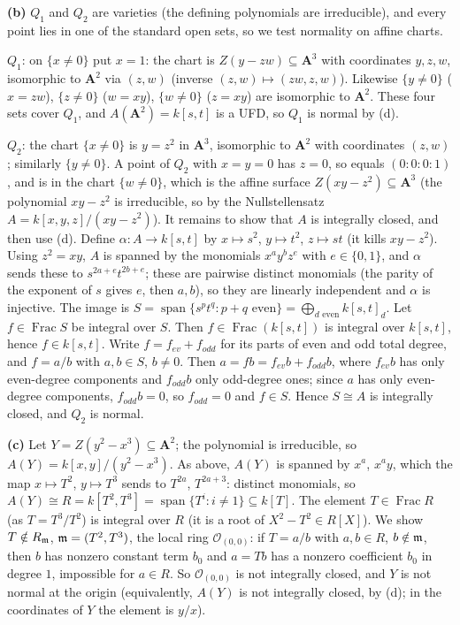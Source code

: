 \documentclass[11pt]{article}
\begin{document}
\textbf{(b)} $Q_1$ and $Q_2$ are varieties (the defining polynomials are irreducible), and every point lies in one of the standard open sets, so we test normality on affine charts.

$Q_1$: on $\{x\ne0\}$ put $x=1$: the chart is $Z(y-zw)\subseteq\mathbf A^3$ with coordinates $y,z,w$, isomorphic to $\mathbf A^2$ via $(z,w)$ (inverse $(z,w)\mapsto(zw,z,w)$). Likewise $\{y\ne0\}$ ($x=zw$), $\{z\neq0\}$ ($w=xy$), $\{w\ne0\}$ ($z=xy$) are isomorphic to $\mathbf A^2$. These four sets cover $Q_1$, and $A(\mathbf A^2)=k[s,t]$ is a UFD, so $Q_1$ is normal by (d).

$Q_2$: the chart $\{x\neq0\}$ is $y=z^2$ in $\mathbf A^3$, isomorphic to $\mathbf A^2$ with coordinates $(z,w)$; similarly $\{y\ne0\}$. A point of $Q_2$ with $x=y=0$ has $z=0$, so equals $(0:0:0:1)$, and is in the chart $\{w\ne0\}$, which is the affine surface $Z(xy-z^2)\subseteq\mathbf A^3$ (the polynomial $xy-z^2$ is irreducible, so by the Nullstellensatz $A=k[x,y,z]/(xy-z^2)$). It remains to show that $A$ is integrally closed, and then use (d). Define $\alpha\colon A\to k[s,t]$ by $x\mapsto s^2$, $y\mapsto t^2$, $z\mapsto st$ (it kills $xy-z^2$). Using $z^2=xy$, $A$ is spanned by the monomials $x^ay^bz^e$ with $e\in\{0,1\}$, and $\alpha$ sends these to $s^{2a+e}t^{2b+e}$; these are pairwise distinct monomials (the parity of the exponent of $s$ gives $e$, then $a,b$), so they are linearly independent and $\alpha$ is injective. The image is $S=\operatorname{span}\{s^pt^q:p+q\text{ even}\}=\bigoplus_{d\text{ even}}k[s,t]_d$. Let $f\in\operatorname{Frac}S$ be integral over $S$. Then $f\in\operatorname{Frac}(k[s,t])$ is integral over $k[s,t]$, hence $f\in k[s,t]$. Write $f=f_{ev}+f_{odd}$ for its parts of even and odd total degree, and $f=a/b$ with $a,b\in S$, $b\neq0$. Then $a=fb=f_{ev}b+f_{odd}b$, where $f_{ev}b$ has only even-degree components and $f_{odd}b$ only odd-degree ones; since $a$ has only even-degree components, $f_{odd}b=0$, so $f_{odd}=0$ and $f\in S$. Hence $S\cong A$ is integrally closed, and $Q_2$ is normal.

\textbf{(c)} Let $Y=Z(y^2-x^3)\subseteq\mathbf A^2$; the polynomial is irreducible, so $A(Y)=k[x,y]/(y^2-x^3)$. As above, $A(Y)$ is spanned by $x^a$, $x^ay$, which the map $x\mapsto T^2$, $y\mapsto T^3$ sends to $T^{2a}$, $T^{2a+3}$: distinct monomials, so $A(Y)\cong R=k[T^2,T^3]=\operatorname{span}\{T^i:i\ne1\}\subseteq k[T]$. The element $T\in\operatorname{Frac}R$ (as $T=T^3/T^2$) is integral over $R$ (it is a root of $X^2-T^2\in R[X]$). We show $T\notin R_{\mathfrak m}$, $\mathfrak m=(T^2,T^3)$, the local ring $\mathcal{O}_{(0,0)}$: if $T=a/b$ with $a,b\in R$, $b\notin\mathfrak m$, then $b$ has nonzero constant term $b_0$ and $a=Tb$ has a nonzero coefficient $b_0$ in degree $1$, impossible for $a\in R$. So $\mathcal{O}_{(0,0)}$ is not integrally closed, and $Y$ is not normal at the origin (equivalently, $A(Y)$ is not integrally closed, by (d); in the coordinates of $Y$ the element is $y/x$).
\end{document}

